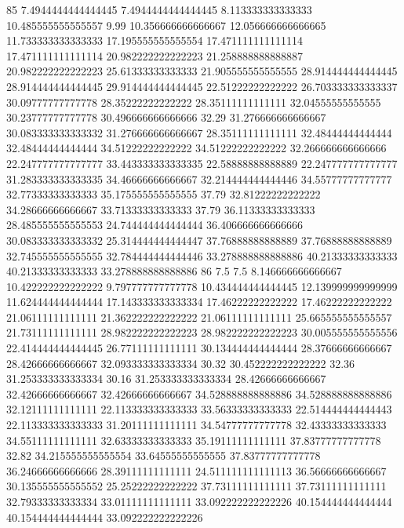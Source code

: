 85 7.4944444444444445 7.4944444444444445 8.113333333333333 10.485555555555557 9.99 10.356666666666667 12.056666666666665 11.733333333333333 17.195555555555554 17.471111111111114 17.471111111111114 20.982222222222223 21.258888888888887 20.982222222222223 25.61333333333333 21.905555555555555 28.914444444444445 28.914444444444445 29.914444444444445 22.51222222222222 26.703333333333337 30.09777777777778 28.35222222222222 28.35111111111111 32.04555555555555 30.23777777777778 30.496666666666666 32.29 31.276666666666667 30.083333333333332 31.276666666666667 28.35111111111111 32.48444444444444 32.48444444444444 34.51222222222222 34.51222222222222 32.266666666666666 22.247777777777777 33.443333333333335 22.58888888888889 22.247777777777777 31.283333333333335 34.46666666666667 32.214444444444446 34.55777777777777 32.77333333333333 35.175555555555555 37.79 32.81222222222222 34.28666666666667 33.71333333333333 37.79 36.11333333333333 28.485555555555553 24.744444444444444 36.406666666666666 30.083333333333332 25.314444444444447 37.76888888888889 37.76888888888889 32.745555555555555 32.784444444444446 33.278888888888886 40.21333333333333 40.21333333333333 33.278888888888886
86 7.5 7.5 8.146666666666667 10.422222222222222 9.797777777777778 10.434444444444445 12.139999999999999 11.624444444444444 17.143333333333334 17.46222222222222 17.46222222222222 21.06111111111111 21.362222222222222 21.06111111111111 25.665555555555557 21.73111111111111 28.982222222222223 28.982222222222223 30.005555555555556 22.414444444444445 26.77111111111111 30.134444444444444 28.37666666666667 28.42666666666667 32.093333333333334 30.32 30.452222222222222 32.36 31.253333333333334 30.16 31.253333333333334 28.42666666666667 32.42666666666667 32.42666666666667 34.528888888888886 34.528888888888886 32.12111111111111 22.113333333333333 33.56333333333333 22.514444444444443 22.113333333333333 31.20111111111111 34.54777777777778 32.43333333333333 34.55111111111111 32.63333333333333 35.19111111111111 37.83777777777778 32.82 34.215555555555554 33.64555555555555 37.83777777777778 36.24666666666666 28.39111111111111 24.511111111111113 36.56666666666667 30.135555555555552 25.25222222222222 37.73111111111111 37.73111111111111 32.79333333333334 33.01111111111111 33.092222222222226 40.154444444444444 40.154444444444444 33.092222222222226
